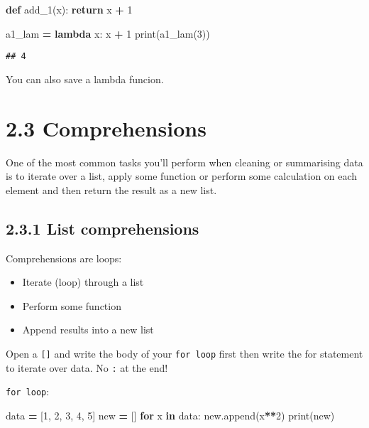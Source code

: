 \documentclass[]{book}
\newenvironment{Shaded}{\begin{snugshade}}{\end{snugshade}}
\newcommand{\BuiltInTok}[1]{#1}
\newcommand{\ControlFlowTok}[1]{\textcolor[rgb]{0.13,0.29,0.53}{\textbf{#1}}}
\newcommand{\DecValTok}[1]{\textcolor[rgb]{0.00,0.00,0.81}{#1}}
\newcommand{\KeywordTok}[1]{\textcolor[rgb]{0.13,0.29,0.53}{\textbf{#1}}}
\newcommand{\NormalTok}[1]{#1}
\newcommand{\OperatorTok}[1]{\textcolor[rgb]{0.81,0.36,0.00}{\textbf{#1}}}
\providecommand{\tightlist}{%
  \setlength{\itemsep}{0pt}\setlength{\parskip}{0pt}}
\theoremstyle{definition}
\theoremstyle{definition}
\theoremstyle{definition}
\theoremstyle{remark}
\begin{document}
\begin{Shaded}
\begin{Highlighting}[]
\KeywordTok{def}\NormalTok{ add_1(x):}
    \ControlFlowTok{return}\NormalTok{ x }\OperatorTok{+} \DecValTok{1}
    
\NormalTok{a1_lam }\OperatorTok{=} \KeywordTok{lambda}\NormalTok{ x: x }\OperatorTok{+} \DecValTok{1}
\BuiltInTok{print}\NormalTok{(a1_lam(}\DecValTok{3}\NormalTok{))}
\end{Highlighting}
\end{Shaded}

\begin{verbatim}
## 4
\end{verbatim}

You can also save a lambda funcion.

\hypertarget{comprehensions}{%
\section{2.3 Comprehensions}\label{comprehensions}}

One of the most common tasks you'll perform when cleaning or summarising
data is to iterate over a list, apply some function or perform some
calculation on each element and then return the result as a new list.

\hypertarget{list-comprehensions}{%
\subsection{2.3.1 List comprehensions}\label{list-comprehensions}}

Comprehensions are loops:

\begin{itemize}
\tightlist
\item
  Iterate (loop) through a list
\item
  Perform some function
\item
  Append results into a new list
\end{itemize}

Open a \texttt{{[}{]}} and write the body of your \texttt{for\ loop}
first then write the for statement to iterate over data. No \texttt{:}
at the end!

\texttt{for\ loop}:

\begin{Shaded}
\begin{Highlighting}[]
\NormalTok{data }\OperatorTok{=}\NormalTok{ [}\DecValTok{1}\NormalTok{, }\DecValTok{2}\NormalTok{, }\DecValTok{3}\NormalTok{, }\DecValTok{4}\NormalTok{, }\DecValTok{5}\NormalTok{]}
\NormalTok{new }\OperatorTok{=}\NormalTok{ []}
\ControlFlowTok{for}\NormalTok{ x }\KeywordTok{in}\NormalTok{ data:}
\NormalTok{    new.append(x}\OperatorTok{**}\DecValTok{2}\NormalTok{)}
\BuiltInTok{print}\NormalTok{(new)}
\end{Highlighting}
\end{Shaded}
\end{document}
